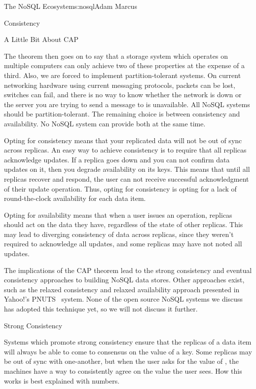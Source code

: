 \begin{aosachapter}{The NoSQL Ecosystem}{s:nosql}{Adam Marcus}
\begin{aosasect1}{Consistency}
\begin{aosasect2}{A Little Bit About CAP}
\begin{aosadescription}
\end{aosadescription}

The theorem then goes on to say that a storage system which operates on
multiple computers can only achieve two of these properties at the
expense of a third.  Also, we are forced to implement partition-tolerant
systems.  On current networking
hardware using current messaging protocols, packets can be lost,
switches can fail, and there is no way to know whether the network is
down or the server you are trying to send a message to is unavailable.
All NoSQL systems should be partition-tolerant.  The remaining choice
is between consistency and availability.  No NoSQL system can provide
both at the same time.

Opting for consistency means that your replicated data will not be out
of sync across replicas.  An easy way to achieve consistency is to
require that all replicas acknowledge updates.  If a replica goes down
and you can not confirm data updates on it, then you degrade
availability on its keys.  This means that until all replicas recover and respond, the user can not
receive successful acknowledgment of their update operation.  Thus, opting
for consistency is opting for a lack of round-the-clock availability
for each data item.

Opting for availability means that when a user issues an operation,
replicas should act on the
data they have, regardless of the state of other replicas.  This may
lead to diverging consistency of data across replicas, since they
weren't required to acknowledge all updates, and some replicas may
have not noted all updates.

The implications of the CAP theorem lead to the strong consistency and
eventual consistency approaches to building NoSQL data stores.  Other
approaches exist, such as the relaxed consistency and relaxed
availability approach presented in Yahoo!'s PNUTS~\cite{bib:pnuts} system.  None of
the open source NoSQL systems we discuss has adopted this technique yet,
so we will not discuss it further.

\end{aosasect2}

\begin{aosasect2}{Strong Consistency}

Systems which promote strong consistency ensure that the replicas of a
data item will always be able to come to consensus on the value of a
key.  Some replicas may be out of sync with one-another, but when the
user asks for the value of , the machines have
a way to consistently agree on the value the user sees.  How this
works is best explained with numbers.


\end{aosasect2}
\end{aosasect1}
\end{aosachapter}
